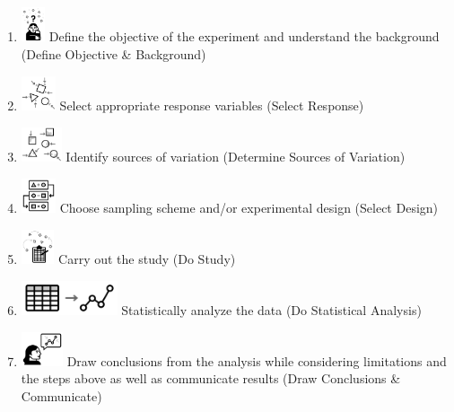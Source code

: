 \documentclass[
]{book}
\providecommand{\tightlist}{%
  \setlength{\itemsep}{0pt}\setlength{\parskip}{0pt}}
\theoremstyle{definition}
\theoremstyle{definition}
\theoremstyle{definition}
\theoremstyle{remark}
\begin{document}
\begin{enumerate}
\def\labelenumi{\arabic{enumi}.}
\tightlist
\item
  \includegraphics[width=\textwidth,height=0.4in]{img/defineObjective.png}
  Define the objective of the experiment and understand the background (Define Objective \& Background)\\
\item
  \includegraphics[width=\textwidth,height=0.4in]{img/selectResponse.png} Select appropriate response variables (Select Response)\\
\item
  \includegraphics[width=\textwidth,height=0.4in]{img/determineVariation.png} Identify sources of variation (Determine Sources of Variation)\\
\item
  \includegraphics[width=\textwidth,height=0.4in]{img/selectDesign.png} Choose sampling scheme and/or experimental design (Select Design)\\
\item
  \includegraphics[width=\textwidth,height=0.4in]{img/conductStudy.png} Carry out the study (Do Study)
\item
  \includegraphics[width=\textwidth,height=0.4in]{img/statsAnalysis.png} Statistically analyze the data (Do Statistical Analysis)\\
\item
  \includegraphics[width=\textwidth,height=0.4in]{img/concludeCommunicate.png} Draw conclusions from the analysis while considering limitations and the steps above as well as communicate results (Draw Conclusions \& Communicate)
\end{enumerate}
\end{document}
